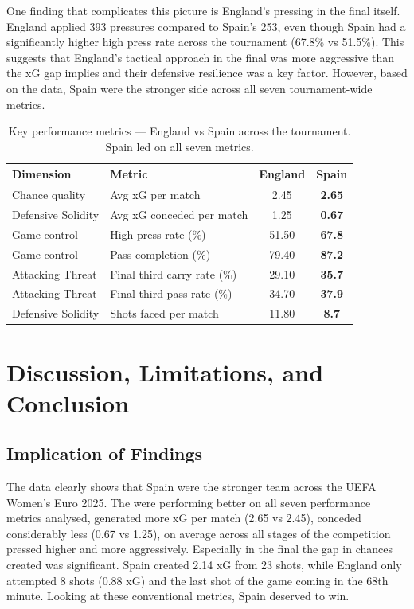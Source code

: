 \documentclass[
  11pt,
  a4paper,
  DIV=11,
  numbers=noendperiod]{scrartcl}
\begin{document}
One finding that complicates this picture is England's pressing in the
final itself. England applied 393 pressures compared to Spain's 253,
even though Spain had a significantly higher high press rate across the
tournament (67.8\% vs 51.5\%). This suggests that England's tactical
approach in the final was more aggressive than the xG gap implies and
their defensive resilience was a key factor. However, based on the data,
Spain were the stronger side across all seven tournament-wide metrics.

\begin{longtable}[]{@{}llcc@{}}

\caption{\label{tbl-verdict}Key performance metrics --- England vs Spain
across the tournament. Spain led on all seven metrics.}

\tabularnewline

\toprule\noalign{}
Dimension & Metric & England & Spain \\
\midrule\noalign{}
\endhead
\bottomrule\noalign{}
\endlastfoot
Chance quality & Avg xG per match & 2.45 & \textbf{2.65} \\
Defensive Solidity & Avg xG conceded per match & 1.25 & \textbf{0.67} \\
Game control & High press rate (\%) & 51.50 & \textbf{67.8} \\
Game control & Pass completion (\%) & 79.40 & \textbf{87.2} \\
Attacking Threat & Final third carry rate (\%) & 29.10 &
\textbf{35.7} \\
Attacking Threat & Final third pass rate (\%) & 34.70 & \textbf{37.9} \\
Defensive Solidity & Shots faced per match & 11.80 & \textbf{8.7} \\

\end{longtable}

\section{Discussion, Limitations, and
Conclusion}\label{discussion-limitations-and-conclusion}

\subsection{Implication of Findings}\label{implication-of-findings}

The data clearly shows that Spain were the stronger team across the UEFA
Women's Euro 2025. The were performing better on all seven performance
metrics analysed, generated more xG per match (2.65 vs 2.45), conceded
considerably less (0.67 vs 1.25), on average across all stages of the
competition pressed higher and more aggressively. Especially in the
final the gap in chances created was significant. Spain created 2.14 xG
from 23 shots, while England only attempted 8 shots (0.88 xG) and the
last shot of the game coming in the 68th minute. Looking at these
conventional metrics, Spain deserved to win.
\end{document}
